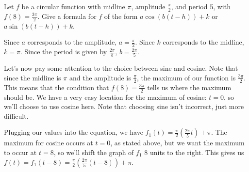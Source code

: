 \documentclass{ximera}
\begin{document}
\begin{example}
Let $f$ be a circular function with midline $\pi$, amplitude $\frac{\pi}{2}$, and period 5, with $f(8) = \frac{3\pi}{2}$. Give a formula for $f$ of the form $a\cos(b(t - h)) + k$ or $a\sin(b(t - h)) + k$.
\begin{explanation}
Since $a$ corresponds to the amplitude, $a = \frac{\pi}{2}$. Since $k$ corresponds to the midline, $k = \pi$. Since the period is given by $\frac{2\pi}{b}$, $b = \frac{2\pi}{5}$. 

Let's now pay some attention to the choice between sine and cosine. Note that since the midline is $\pi$ and the amplitude is $\frac{\pi}{2}$, the maximum of our function is $\frac{3\pi}{2}$. This means that the condition that $f(8) = \frac{3\pi}{2}$ tells us where the maximum should be. We have a very easy location for the maximum of cosine: $t = 0$, so we'll choose to use cosine here. Note that choosing sine isn't incorrect, just more difficult.

Plugging our values into the equation, we have $f_1(t) = \frac{\pi}{2}\left(\frac{2\pi}{5}t\right) + \pi$. The maximum for cosine occurs at $t = 0$, as stated above, but we want the maximum to occur at $t = 8$, so we'll shift the graph of $f_1$ 8 units to the right. This gives us $f(t) = f_1(t - 8) =  \frac{\pi}{2}\left(\frac{2\pi}{5}(t - 8)\right) + \pi$.
\end{explanation}
\end{example}
\end{document}

